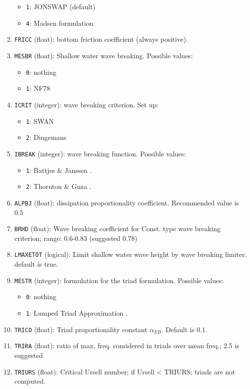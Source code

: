 \documentclass[12pt]{amsart}
\begin{document}
\begin{enumerate}
\begin{itemize}
  \item {\tt 1}: JONSWAP (default)
  \item {\tt 4}: Madsen formulation
  \end{itemize}
\item {\tt FRICC} (float): bottom friction coefficient (always positive).
\item {\tt MESBR} (float): Shallow water wave breaking. Possible values:
  \begin{itemize}
  \item {\tt 0}: nothing
  \item {\tt 1}: NF78
  \end{itemize}
\item {\tt ICRIT} (integer): wave breaking criterion. Set up:
  \begin{itemize}
  \item {\tt 1}: SWAN
  \item {\tt 2}: Dingemans
  \end{itemize}
\item {\tt IBREAK} (integer): wave breaking function. Possible values:
  \begin{itemize}
  \item {\tt 1}: Battjes \& Janssen \cite{BattjesJanssen}.
  \item {\tt 2}: Thornton \& Guza \cite{ThorntonGuza}.
  \end{itemize}
\item {\tt ALPBJ} (float): dissipation proportionality coefficient. Recommended value is 0.5
\item {\tt BRHD} (float): Wave breaking coefficient for Const. type wave breaking criterion; range: 0.6-0.83 (suggested 0.78)
\item {\tt LMAXETOT} (logical): Limit shallow water wave height by wave breaking limiter. default is true.
\item {\tt MESTR} (integer): formulation for the triad formulation. Possible values:
  \begin{itemize}
  \item {\tt 0}: nothing
  \item {\tt 1}: Lumped Triad Approximation \cite{LTA}.
  \end{itemize}
\item {\tt TRICO} (float): Triad proportionality constant $\alpha_{EB}$. Default is $0.1$.
\item {\tt TRIRA} (float): ratio of max. freq. considered in triads over mean freq.; 2.5 is suggested
\item {\tt TRIURS} (float): Critical Ursell number; if Ursell < TRIURS; triads are not computed.
\end{enumerate}
\end{document}

